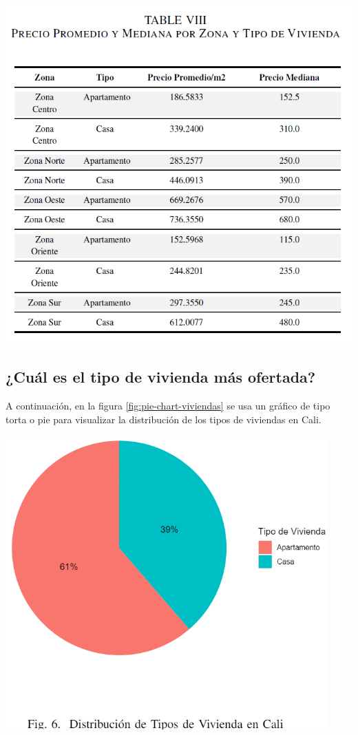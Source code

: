 \documentclass[conference,final,]{IEEEtran}
\begin{document}
\begin{center}\includegraphics[width=0.9\linewidth]{images/Table8} \end{center}

\subsection{\textbf{¿Cuál es el tipo de vivienda más ofertada?}}

A continuación, en la figura \ref{fig:pie-chart-viviendas} se usa un
gráfico de tipo torta o pie para visualizar la distribución de los tipos
de viviendas en Cali.

\begin{flushright}\includegraphics[width=0.9\linewidth]{images/pie-chart-viviendas} \end{flushright}
\end{document}
